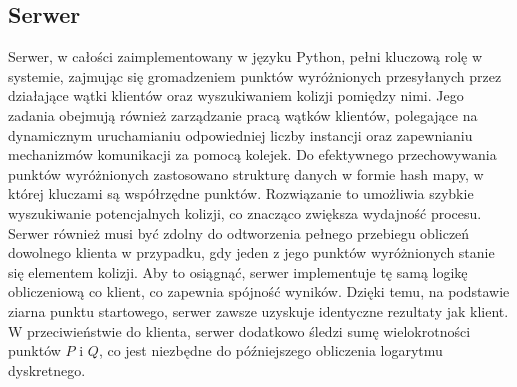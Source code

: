 \subsection{Serwer}
Serwer, w całości zaimplementowany w języku Python, pełni kluczową rolę w systemie,
zajmując się gromadzeniem punktów wyróżnionych przesyłanych przez działające wątki klientów oraz wyszukiwaniem
kolizji pomiędzy nimi. Jego zadania obejmują również zarządzanie pracą
wątków klientów, polegające na dynamicznym uruchamianiu odpowiedniej liczby instancji
oraz zapewnianiu mechanizmów komunikacji za pomocą kolejek.
Do efektywnego przechowywania punktów wyróżnionych zastosowano strukturę danych w formie
hash mapy, w której kluczami są współrzędne punktów.
Rozwiązanie to umożliwia szybkie wyszukiwanie potencjalnych kolizji,
co znacząco zwiększa wydajność procesu.
Serwer również musi być zdolny do odtworzenia pełnego przebiegu obliczeń dowolnego klienta w przypadku,
gdy jeden z jego punktów wyróżnionych stanie się elementem kolizji.
Aby to osiągnąć, serwer implementuje tę samą logikę obliczeniową co klient,
co zapewnia spójność wyników. Dzięki temu, na podstawie ziarna punktu startowego, serwer zawsze uzyskuje identyczne
rezultaty jak klient.
W przeciwieństwie do klienta,
serwer dodatkowo śledzi sumę wielokrotności punktów $P$ i $Q$,
co jest niezbędne do późniejszego obliczenia logarytmu dyskretnego.

